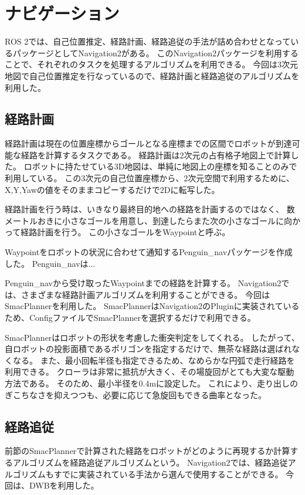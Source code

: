 \section{ナビゲーション}
ROS 2では、自己位置推定、経路計画、経路追従の手法が詰め合わせとなっているパッケージとしてNavigation2\cite{macenski2020marathon2}がある。
このNavigation2パッケージを利用することで、それぞれのタスクを処理するアルゴリズムを利用できる。
今回は3次元地図で自己位置推定を行なっているので、経路計画と経路追従のアルゴリズムを利用した。

\subsection{経路計画}
経路計画は現在の位置座標からゴールとなる座標までの区間でロボットが到達可能な経路を計算するタスクである。
経路計画は2次元の占有格子地図上で計算した。
ロボットに持たせている3D地図は、単純に地図上の座標を知ることのみで利用している。
この3次元の自己位置座標から、2次元空間で利用するために、X,Y,Yawの値をそのままコピーするだけで2Dに転写した。

経路計画を行う時は、いきなり最終目的地への経路を計画するのではなく、
数メートルおきに小さなゴールを用意し、到達したらまた次の小さなゴールに向かって経路計画を行う。
この小さなゴールをWaypointと呼ぶ。

Waypointをロボットの状況に合わせて通知するPenguin\_navパッケージ\cite{Penguin}を作成した。
Penguin\_navは...

Penguin\_navから受け取ったWaypointまでの経路を計算する。
Navigation2では、さまざまな経路計画アルゴリズムを利用することができる。
今回はSmacPlanner\cite{macenski2024smac}を利用した。
SmacPlannerはNavigation2のPluginに実装されているため、ConfigファイルでSmacPlannerを選択するだけで利用できる。

SmacPlannerはロボットの形状を考慮した衝突判定をしてくれる。
したがって、自ロボットの投影面積であるポリゴンを指定するだけで、無茶な経路は選ばれなくなる。
また、最小回転半径も指定できるため、なめらかな円弧で走行経路を利用できる。
クローラは非常に抵抗が大きく、その場旋回がとても大変な駆動方法である。
そのため、最小半径を0.4mに設定した。
これにより、走り出しのぎこちなさを抑えつつも、必要に応じて急旋回もできる曲率となった。

\subsection{経路追従}
前節のSmacPlannerで計算された経路をロボットがどのように再現するか計算するアルゴリズムを経路追従アルゴリズムという。
Navigation2では、経路追従アルゴリズムもすでに実装されている手法から選んで使用することができる。
今回は、DWBを利用した。

